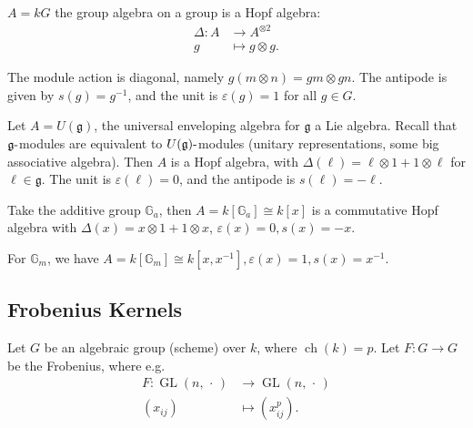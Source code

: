 \begin{example}

\(A = kG\) the group algebra on a group is a Hopf algebra:
\begin{align*}  
\Delta: A &\to A^{\otimes 2} \\
g &\mapsto g\otimes g
.\end{align*}

The module action is diagonal, namely \(g(m\otimes n) = gm \otimes gn\).
The antipode is given by \(s(g) = g^{-1}\), and the unit is
\(\varepsilon(g) = 1\) for all \(g\in G\).

\end{example}

\begin{example}

Let \(A = U({\mathfrak{g}})\), the universal enveloping algebra for
\({\mathfrak{g}}\) a Lie algebra. Recall that
\({\mathfrak{g}}{\hbox{-}}\)modules are equivalent to
\(U({\mathfrak{g}}){\hbox{-}}\)modules (unitary representations, some
big associative algebra). Then \(A\) is a Hopf algebra, with
\(\Delta(\ell) = \ell\otimes 1 + 1\otimes\ell\) for
\(\ell \in {\mathfrak{g}}\). The unit is \(\varepsilon(\ell) = 0\), and
the antipode is \(s(\ell) = -\ell\).

\end{example}

\begin{example}

Take the additive group \({\mathbb{G}}_a\), then
\(A = k[{\mathbb{G}}_a] \cong k[x]\) is a commutative Hopf algebra with
\(\Delta(x) = x\otimes 1 + 1\otimes x\),
\(\varepsilon(x) = 0, s(x) = -x\).

\end{example}

\begin{example}

For \({\mathbb{G}}_m\), we have
\(A = k[{\mathbb{G}}_m] \cong k[x, x^{-1}], \varepsilon(x) = 1, s(x) = x^{-1}\).

\end{example}

\hypertarget{frobenius-kernels}{%
\subsection{Frobenius Kernels}\label{frobenius-kernels}}

Let \(G\) be an algebraic group (scheme) over \(k\), where
\(\operatorname{ch}(k) = p\). Let \(F:G\to G\) be the Frobenius, where
e.g.
\begin{align*}  
F:\operatorname{GL}(n, {\,\cdot\,}) &\to \operatorname{GL}(n, {\,\cdot\,})\\
(x_{ij}) & \mapsto (x_{ij}^p)
.\end{align*}

